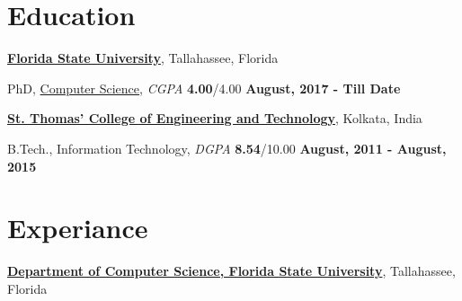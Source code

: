 \documentclass[margin,line]{res}
\newenvironment{list1}{
  \begin{list}{\ding{113}}{%
      \setlength{\itemsep}{0in}
      \setlength{\parsep}{0in} \setlength{\parskip}{0in}
      \setlength{\topsep}{0in} \setlength{\partopsep}{0in} 
      \setlength{\leftmargin}{0.17in}}}{\end{list}}
\begin{document}
\begin{resume}
\vspace*{-.18in}

\section{\sc Education}
{\bf \href{http://www.fsu.edu}{Florida State University}}, Tallahassee, 
Florida\\
\vspace*{-.18in}
\begin{list1}
	\item[] PhD, \href{http://www.cs.fsu.edu/}{Computer Science}, \textit{CGPA} 
	\textbf{4.00}/4.00 \hfill {\bf August, 2017 - Till Date}
\end{list1}
\vspace*{-.18in}
{\bf \href{http://www.stcet.org/}{St. Thomas' College of Engineering and 
		Technology}}, Kolkata, India\\
\vspace*{-.18in}
\begin{list1}
	\item[] B.Tech., Information Technology,
	\textit{DGPA} \textbf{8.54}/10.00 \hfill {\bf August, 2011 - August, 2015}
\end{list1}

\vspace*{-.18in}

\section{\sc Experiance}
{\bf \href{http://www.cs.fsu.edu/}{Department of Computer Science, Florida 
State University}}, Tallahassee, Florida


\end{resume}
\end{document}
